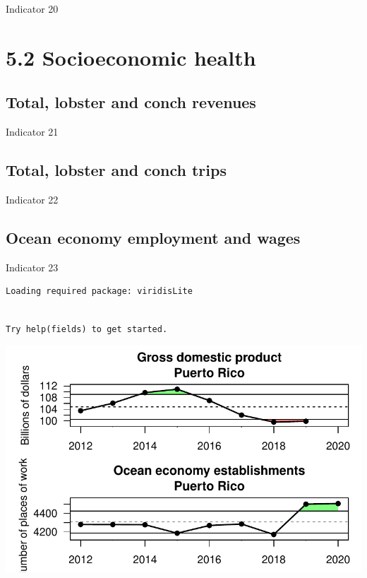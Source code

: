 \documentclass[
  letterpaper,
  oneside,
  open=any]{scrbook}
\begin{document}
Indicator 20

\hypertarget{socioeconomic-health}{%
\section{5.2 Socioeconomic health}\label{socioeconomic-health}}

\hypertarget{total-lobster-and-conch-revenues}{%
\subsection{Total, lobster and conch
revenues}\label{total-lobster-and-conch-revenues}}

Indicator 21

\hypertarget{total-lobster-and-conch-trips}{%
\subsection{Total, lobster and conch
trips}\label{total-lobster-and-conch-trips}}

Indicator 22

\hypertarget{ocean-economy-employment-and-wages}{%
\subsection{Ocean economy employment and
wages}\label{ocean-economy-employment-and-wages}}

Indicator 23

\begin{verbatim}
Loading required package: viridisLite
\end{verbatim}

\begin{verbatim}

Try help(fields) to get started.
\end{verbatim}

\includegraphics{Report_book_files/Performance_indicators_files/figure-pdf/unnamed-chunk-2-1.pdf}
\end{document}
